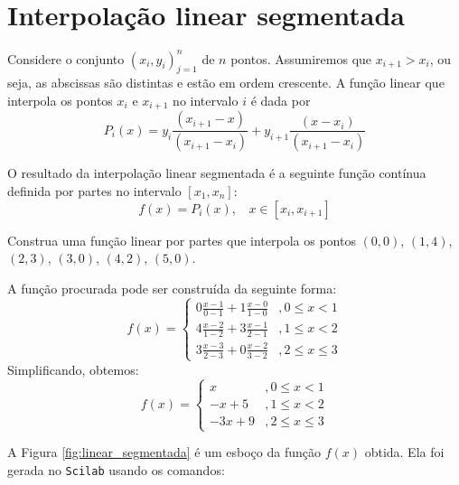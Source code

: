 \documentclass[main.tex]{subfiles}
\begin{document}
\section{Interpolação linear segmentada}
Considere o conjunto $\left(x_i,y_i\right)_{j=1}^n$ de $n$ pontos. Assumiremos que $x_{i+1}>x_i$, ou seja, as abscissas são distintas e estão em ordem crescente. A função linear que interpola os pontos $x_i$ e $x_{i+1}$ no intervalo $i$ é dada por
$$P_i(x)=y_i \frac{(x_{i+1}-x)}{(x_{i+1}-x_i)} + y_{i+1} \frac{(x-x_i)}{(x_{i+1}-x_i)}$$

O resultado da interpolação linear segmentada é a seguinte função contínua definida por partes no intervalo $[x_1,x_n]$:
$$f(x)=P_i(x), ~~~~ x\in [x_i,x_{i+1}]$$

\begin{ex}
  Construa uma função linear por partes que interpola os pontos $(0,0)$, $(1,4)$, $(2,3)$, $(3,0)$, $(4,2)$, $(5,0)$.

A função procurada pode ser construída da seguinte forma:
\begin{equation*}
  f(x) = \left\{
    \begin{array}{ll}
      0\frac{x-1}{0-1} + 1\frac{x-0}{1-0} &, 0 \leq x < 1\\
      4\frac{x-2}{1-2} + 3\frac{x-1}{2-1} &, 1\leq x < 2\\
      3\frac{x-3}{2-3} + 0\frac{x-2}{3-2} &, 2\leq x \leq 3
    \end{array}
\right.
\end{equation*}
Simplificando, obtemos:
\begin{equation*}
  f(x) = \left\{
    \begin{array}{ll}
      x &, 0 \leq x < 1\\
      -x + 5 &, 1\leq x < 2\\
      -3x + 9 &, 2\leq x \leq 3
    \end{array}
\right.  
\end{equation*}
\end{ex}

A Figura \ref{fig:linear_segmentada} é um esboço da função $f(x)$ obtida. 
\ifisscilab
Ela foi gerada no \verb+Scilab+ usando os comandos:

\fi
\end{document}
